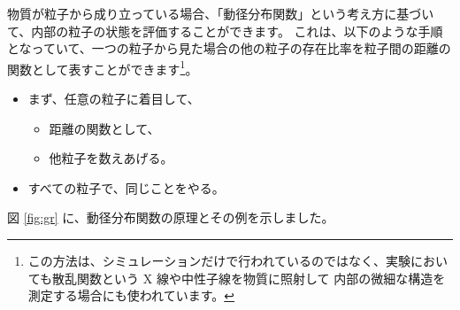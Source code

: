 \documentclass[uplatex,dvipdfmx,a4paper,11pt]{jsarticle}
\begin{document}
物質が粒子から成り立っている場合、「動径分布関数」という考え方に基づいて、内部の粒子の状態を評価することができます。
これは、以下のような手順となっていて、一つの粒子から見た場合の他の粒子の存在比率を粒子間の距離の関数として表すことができます\footnote{
	この方法は、シミュレーションだけで行われているのではなく、実験においても散乱関数という X 線や中性子線を物質に照射して
	内部の微細な構造を測定する場合にも使われています。
}。
\begin{itemize}
	\item まず、任意の粒子に着目して、
	\begin{itemize}
		\item 距離の関数として、
		\item 他粒子を数えあげる。
	\end{itemize}
	\item すべての粒子で、同じことをやる。
\end{itemize}

図 \ref{fig:gr} に、動径分布関数の原理とその例を示しました。
\end{document}
